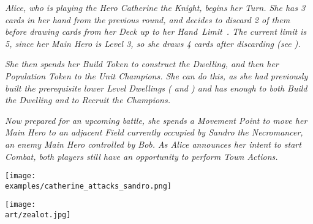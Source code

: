 \begin{multicols}{2}
\textit{Alice, who is playing the Hero Catherine the Knight, begins her Turn.
She has 3 cards in her hand from the previous round, and decides to discard 2 of them before drawing cards from her Deck up to her \mbox{Hand Limit .}
The current limit is 5, since her Main Hero is Level 3, so she draws 4 cards after discarding (see ).}\par
\textit{She then spends her Build Token to construct the  Dwelling, and then her Population Token to  the  Unit Champions.
She can do this, as she had previously built the prerequisite lower Level Dwellings ( and ) and has enough  to both Build the Dwelling and to Recruit the Champions.}\par
\textit{Now prepared for an upcoming battle, she spends a Movement Point to move her Main Hero to an adjacent Field currently occupied by Sandro the Necromancer, an enemy Main Hero controlled by Bob.
As Alice announces her intent to start Combat, both players still have an opportunity to perform Town Actions.}\par

\texttt{[image: \\examples/catherine\_attacks\_sandro.png]}

\end{multicols}

\vfill

\begin{scaledfigure}[blanker]
 \centering
 \texttt{[image: \\art/zealot.jpg]}
\end{scaledfigure}
